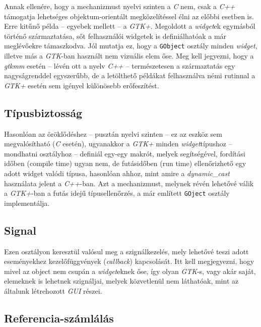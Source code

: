 Annak ellenére, hogy a mechanizmust nyelvi szinten a \textit{C} nem, csak a \textit{C++} támogatja lehetséges objektum-orientált megközelítéssel élni az előbbi esetben is. Erre kitűnő példa -- egyebek mellett -- a \textit{GTK+}. Megoldott a \textit{widget}ek egymásból történő származtatása, sőt felhasználói widgetek is definiálhatóak a már meglévőekre támaszkodva. Jól mutatja ez, hogy a \texttt{GObject} osztály minden \textit{widget}, illetve más a \textit{GTK}-ban használt nem vizuális elem őse. Meg kell jegyezni, hogy a \textit{gtkmm} esetén -- lévén ott a nyelv \textit{C++} -- természetesen a származtatás egy nagyságrenddel egyszerűbb, de a letölthető példákat felhasználva némi rutinnal a \textit{GTK+} esetén sem igényel különösebb erőfeszítést.

\subsection{Típusbiztosság}

Hasonlóan az öröklődéshez -- pusztán nyelvi szinten -- ez az eszköz sem megvalósítható (\textit{C} esetén), ugyanakkor a \textit{GTK+} minden \textit{widget}típushoz -- mondhatni osztályhoz -- definiál egy-egy makrót, melyek segítségével, fordítási időben (compile time) ugyan nem, de futásidőben (run time) ellenőrizhető egy adott widget valódi típusa, hasonlóan ahhoz, mint amire a \textit{dynamic\_cast} használata jelent a \textit{C++}-ban. Azt a mechanizmust, melynek révén lehetővé válik a \textit{GTK+}-ban a futás idejű típusellenőrzés, a már említett \texttt{GOject} osztály implementálja.

\subsection{Signal}

Ezen osztályon keresztül valósul meg a szignálkezelés, mely lehetővé teszi adott eseményekhez kezelőfüggvények (\textit{callback}) kapcsolását. Itt kell megjegyezni, hogy mivel az object nem csupán a \textit{widget}eknek őse, így olyan \textit{GTK}-s, vagy akár saját, elemeknek is lehetnek szignáljai, melyek közvetlenül nem láthatóak, mint az általunk létrehozott \textit{GUI} részei.

\subsection{Referencia-számlálás}

